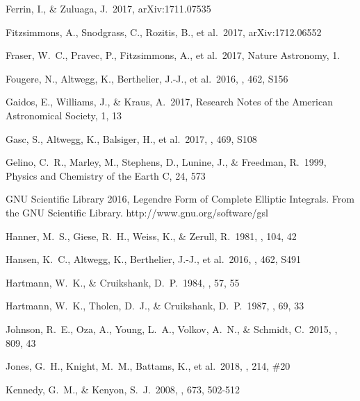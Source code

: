 \documentclass[a4paper,fleqn,usenatbib]{mnras}
\begin{document}
\begin{thebibliography}{99}
 Ferrin, I., \& Zuluaga, J.\ 2017, arXiv:1711.07535

 Fitzsimmons, A., Snodgrass, C., Rozitis, B., et al.\ 2017, arXiv:1712.06552

 Fraser, W.~C., Pravec, P., Fitzsimmons, A., et al.\ 2017, Nature Astronomy, 1.

 Fougere, N., Altwegg, K., Berthelier, J.-J., et al.\ 2016, \mnras, 462, S156 

 Gaidos, E., Williams, J., \& Kraus, A.\ 2017, Research Notes of the American Astronomical Society, 1, 13

 Gasc, S., Altwegg, K., Balsiger, H., et al.\ 2017, \mnras, 469, S108 

 Gelino, C.~R., Marley, M., Stephens, D., Lunine, J., \& Freedman, R.\ 1999, Physics and Chemistry of the Earth C, 24, 573 

 GNU Scientific Library 2016, Legendre Form of Complete Elliptic Integrals. From the GNU Scientific Library. http://www.gnu.org/software/gsl

 Hanner, M.~S., Giese, R.~H., Weiss, K., \& Zerull, R.\ 1981, \aap, 104, 42 

 Hansen, K.~C., Altwegg, K., Berthelier, J.-J., et al.\ 2016, \mnras, 462, S491 

 Hartmann, W.~K., \& Cruikshank, D.~P.\ 1984, \icarus, 57, 55 

 Hartmann, W.~K., Tholen, D.~J., \& Cruikshank, D.~P.\ 1987, \icarus, 69, 33 

 Johnson, R.~E., Oza, A., Young, L.~A., Volkov, A.~N., \& Schmidt, C.\ 2015, \apj, 809, 43 

 Jones, G.~H., Knight, M.~M., Battams, K., et al.\ 2018, \ssr, 214, \#20 

 Kennedy, G.~M., \& Kenyon, S.~J.\ 2008, \apj, 673, 502-512 


\end{thebibliography}
\end{document}
